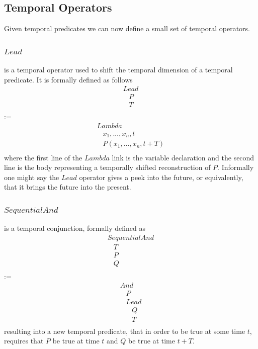 \documentclass[runningheads]{llncs}
\newcommand{\SP}{\;\;\;}
\newcommand{\TLamb}{\textit{Lambda}}
\newcommand{\TAnd}{\textit{And}}
\newcommand{\TSeqAnd}{\textit{SequentialAnd}}
\newcommand{\TLead}{\textit{Lead}}
\begin{document}
\subsection{Temporal Operators}
Given temporal predicates we can now define a small set of temporal
operators.

\subsubsection{$\TLead$} is a temporal operator used to shift the
temporal dimension of a temporal predicate.  It is formally defined as
follows
$$
\begin{array}{l}
  \TLead\\
  \SP P\\
  \SP T\\
\end{array}
$$
:=
$$
\begin{array}{l}
  \TLamb\\
  \SP x_1, ..., x_n, t\\
  \SP P(x_1, ..., x_n, t+T)\\
\end{array}
$$ where the first line of the $\TLamb$ link is the variable
declaration and the second line is the body representing a temporally
shifted reconstruction of $P$.  Informally one might say the $\TLead$
operator gives a peek into the future, or equivalently, that it brings
the future into the present.

\subsubsection{$\TSeqAnd$} is a temporal conjunction, formally defined
as
$$
\begin{array}{l}
  \TSeqAnd\\
  \SP T\\
  \SP P\\
  \SP Q\\
\end{array}
$$
:=
$$
\begin{array}{l}
  \TAnd\\
  \SP P\\
  \SP \TLead\\
  \SP \SP Q\\
  \SP \SP T\\
\end{array}
$$
resulting into a new temporal predicate, that in order to be true
at some time $t$, requires that $P$ be true at time $t$ and $Q$ be
true at time $t+T$.
\end{document}
